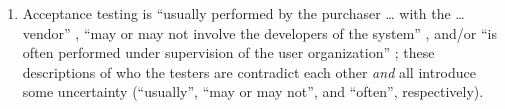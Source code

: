 \begin{enumerate}
{              PetersAndPedrycz2000}; this seems incorrect, since decisions are
          the result of \acsp{p-use}, \emph{not} \acsp{c-use}, and only the
          \acs{p-use} relation is implied by \citep[Fig.~F.1%
              ]{IEEE2021}.
    \item %
          Acceptance testing is ``usually performed by the purchaser \dots{}
          with the \dots{} vendor'' \citep[p.~5]{IEEE2017}, ``may or may not
          involve the developers of the system'' \citep[p.~4-6]{SWEBOK2014},
          and/or ``is often performed under supervision of the user
          organization'' \citep[p.~439]{vanVliet2000}; these descriptions
          of who the testers are contradict each other \emph{and} all introduce
          some uncertainty
          (``usually'', ``may or may not'', and ``often'', respectively).


\end{enumerate}
